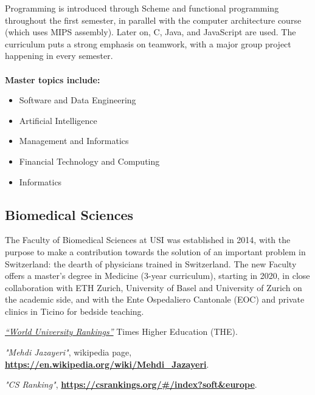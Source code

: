 \documentclass[letterpaper,11pt]{article}
\begin{document}
\begin{multicols}{2}
Programming is introduced through Scheme and functional programming throughout the first semester, in parallel with the computer architecture course (which uses MIPS assembly).
Later on, C, Java, and JavaScript are used.
The curriculum puts a strong emphasis on teamwork, with a major group project happening in every semester.\\\\
\textbf{Master topics include:}
\begin{itemize}
  \setlength{\itemsep}{1.2pt}
  \setlength{\parskip}{0.2pt}
  \setlength{\parsep}{0pt}
    \item Software and Data Engineering
    \item Artificial Intelligence
    \item Management and Informatics
    \item Financial Technology and Computing
    \item Informatics
\end{itemize}

\subsection{Biomedical Sciences}
The Faculty of Biomedical Sciences at USI was established in 2014, with the purpose to make a contribution towards the solution of an important problem in Switzerland: the dearth of physicians trained in Switzerland.
The new Faculty offers a master’s degree in Medicine (3-year curriculum), starting in 2020, in close collaboration with ETH Zurich, University of Basel and University of Zurich on the academic side, and with the Ente Ospedaliero Cantonale (EOC) and private clinics in Ticino for bedside teaching.
\end{multicols}
\newpage
\begin{thebibliography}{999}
    \href{https://www.timeshighereducation.com/world-university-rankings/2021/world-ranking\#!/page/0/length/25/sort\_by/rank/sort\_order/asc/cols/stats}
    {\textit{“World University Rankings”}}
    Times Higher Education (THE).

    \textit{"Mehdi Jazayeri"},
    wikipedia page, 
    \href{https://en.wikipedia.org/wiki/Mehdi_Jazayeri}
        {\textbf{https://en.wikipedia.org/wiki/Mehdi\_Jazayeri}}.

 \textit{"CS Ranking"}, 
    \href{https://csrankings.org/#/index?soft&europe}
        {\textbf{https://csrankings.org/\#/index?soft\&europe}}.
\end{thebibliography}
\end{document}
